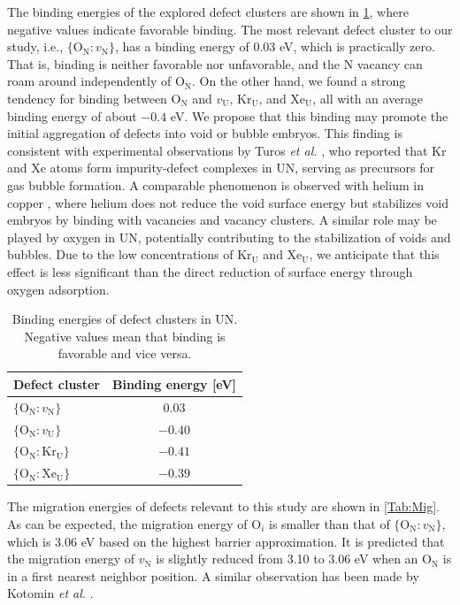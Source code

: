 \documentclass[preprint,12pt,sort&compress]{elsarticle}
\newcommand{\?}{\stackrel{?}{=}}
\begin{document}
The binding energies of the explored defect clusters are shown in \cref{Tab:Eb}, where negative values indicate favorable binding. The most relevant defect cluster to our study, i.e., $\{\text{O}_\text{N} \! : \! v_\text{N}\}$, has a binding energy of 0.03 eV, which is practically zero. That is, binding is neither favorable nor unfavorable, and the N vacancy can roam around independently of $\text{O}_\text{N}$. On the other hand, we found a strong tendency for binding between $\text{O}_\text{N}$ and $v_\text{U}$, $\text{Kr}_\text{U}$, and $\text{Xe}_\text{U}$, all with an average binding energy of about $-0.4$ eV. We propose that this binding may promote the initial aggregation of defects into void or bubble embryos. This finding is consistent with experimental observations by Turos \textit{et al.} \cite{Turos1990}, who reported that Kr and Xe atoms form impurity-defect complexes in UN, serving as precursors for gas bubble formation. A comparable phenomenon is observed with helium in copper \cite{Zinkle1987b}, where helium does not reduce the void surface energy but stabilizes void embryos by binding with vacancies and vacancy clusters. A similar role may be played by oxygen in UN, potentially contributing to the stabilization of voids and bubbles. Due to the low concentrations of $\text{Kr}_\text{U}$ and $\text{Xe}_\text{U}$, we anticipate that this effect is less significant than the direct reduction of surface energy through oxygen adsorption.

\begin{table}[h!]
\centering
\caption{Binding energies of defect clusters in UN. Negative values mean that binding is favorable and vice versa.}
\footnotesize
\begin{tabular}{lc}
\hline
Defect cluster & Binding energy [eV] \\
\hline
$\{\text{O}_\text{N} \! : \! v_\text{N}\}$  & $0.03$  \\
$\{\text{O}_\text{N} \! : \! v_\text{U}\}$  & $-0.40$ \\
$\{\text{O}_\text{N} \! : \! \text{Kr}_\text{U}\}$ & $-0.41$ \\
$\{\text{O}_\text{N} \! : \! \text{Xe}_\text{U}\}$ & $-0.39$ \\
\hline
\end{tabular}
\label{Tab:Eb}
\end{table}

The migration energies of defects relevant to this study are shown in \cref{Tab:Mig}. As can be expected, the migration energy of $\text{O}_i$ is smaller than that of $\{ \text{O}_\text{N} \! : \! v_\text{N} \}$, which is 3.06 eV based on the highest barrier approximation. It is predicted that the migration energy of $v_\text{N}$ is slightly reduced from 3.10 to 3.06 eV when an $\text{O}_\text{N}$ is in a first nearest neighbor position. A similar observation has been made by Kotomin \textit{et al.} \cite{Kotomin2009}.
\end{document}
